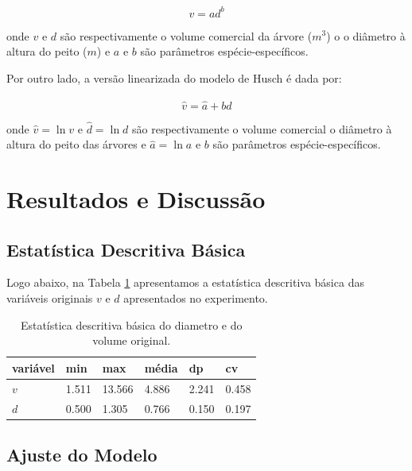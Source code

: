 \documentclass[a4paper,12pt]{article}
\begin{document}
\begin{center}
	\begin{equation}\label{m1}
	v = a d^{b}
	\end{equation}
\end{center}
onde $v$ e $d$ são respectivamente o volume comercial da árvore ($m^3$) o o diâmetro à altura do peito ($m$) e $a$ e $b$ são parâmetros espécie-específicos. 

Por outro lado, a versão linearizada do modelo de Husch é dada por:

\begin{center}
	\begin{equation}\label{m2}
	\hat{v} = \hat{a} + b \hat{d}
	\end{equation}
\end{center}

onde $\hat{v}=\ln v$ e $\hat{d}=\ln d$ são respectivamente o volume comercial o diâmetro à altura do peito das árvores e $\hat{a}=\ln a$ e $b$ são parâmetros espécie-específicos. 

\section{Resultados e Discussão}

\subsection{Estatística Descritiva Básica}

Logo abaixo, na Tabela \ref{t1} apresentamos a estatística descritiva básica das variáveis originais $v$ e $d$ apresentados no experimento.

\begin{table}[h]
\centering 
\caption{Estatística descritiva básica do diametro e do volume original.} 
\label{t1}
\begin{tabular}{llllll}
\hline
variável & min & max & média & dp & cv \\
\hline
$v$ & 1.511 & 13.566 & 4.886  & 2.241 & 0.458  \\
$d$ & 0.500  & 1.305 & 0.766 & 0.150 & 0.197  \\
\hline
\end{tabular}
\end{table}

\subsection{Ajuste do Modelo}
\end{document}
